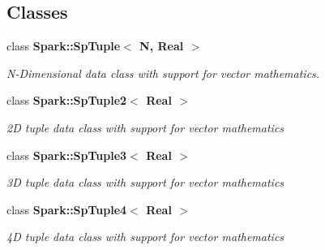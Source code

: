 \subsection*{Classes}
\begin{CompactItemize}
\item 
class {\bf Spark::Sp\-Tuple$<$ N, Real $>$}
\begin{CompactList}\small\item\em N-Dimensional data class with support for vector mathematics. \item\end{CompactList}\item 
class {\bf Spark::Sp\-Tuple2$<$ Real $>$}
\begin{CompactList}\small\item\em 2D tuple data class with support for vector mathematics \item\end{CompactList}\item 
class {\bf Spark::Sp\-Tuple3$<$ Real $>$}
\begin{CompactList}\small\item\em 3D tuple data class with support for vector mathematics \item\end{CompactList}\item 
class {\bf Spark::Sp\-Tuple4$<$ Real $>$}
\begin{CompactList}\small\item\em 4D tuple data class with support for vector mathematics \item\end{CompactList}\end{CompactItemize}
